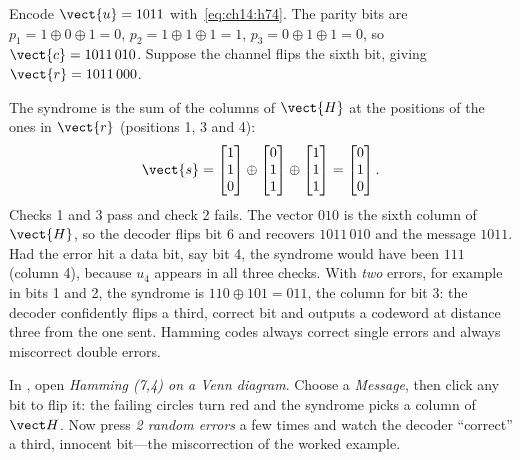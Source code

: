 \begin{worked}
Encode $\vect{u}=1011$ with~\eqref{eq:ch14:h74}. The parity bits are
$p_1=1\oplus0\oplus1=0$, $p_2=1\oplus1\oplus1=1$, $p_3=0\oplus1\oplus1=0$, so
$\vect{c}=1011\,010$. Suppose the channel flips the sixth bit, giving $\vect{r}=1011\,000$.

The syndrome is the sum of the columns of $\vect{H}$ at the positions of the ones in
$\vect{r}$ (positions 1, 3 and 4):
\[
\vect{s}=\begin{bmatrix}1\\1\\0\end{bmatrix}\oplus\begin{bmatrix}0\\1\\1\end{bmatrix}\oplus
\begin{bmatrix}1\\1\\1\end{bmatrix}=\begin{bmatrix}0\\1\\0\end{bmatrix}.
\]
Checks 1 and 3 pass and check 2 fails. The vector $010$ is the sixth column of $\vect{H}$, so the
decoder flips bit 6 and recovers $1011\,010$ and the message $1011$. Had the error hit a
data bit, say bit 4, the syndrome would have been $111$ (column 4), because $u_4$ appears in all
three checks. With \emph{two} errors, for example in bits 1 and 2, the syndrome is
$110\oplus101=011$, the column for bit 3: the decoder confidently flips a third, correct bit
and outputs a codeword at distance three from the one sent. Hamming codes always correct
single errors and always miscorrect double errors.
\end{worked}

\begin{tryit}
In , open \emph{Hamming (7,4) on a Venn diagram}. Choose a
\emph{Message}, then click any bit to flip it: the failing circles turn red and the syndrome picks a
column of $\vect H$. Now press \emph{2 random errors} a few times and watch the decoder ``correct''
a third, innocent bit---the miscorrection of the worked example.
\end{tryit}

